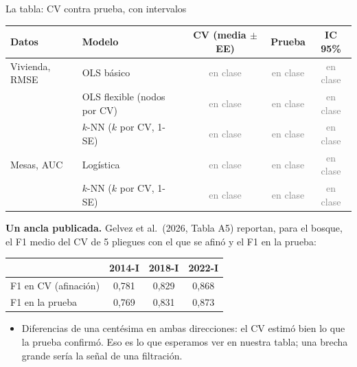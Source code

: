 \documentclass{beamer}
\newcommand{\1}{\mathbb{I}}
\begin{document}
\begin{frame}{La tabla: CV contra prueba, con intervalos}
\small
\begin{center}
\scriptsize
\setlength{\tabcolsep}{3pt}
\renewcommand{\arraystretch}{1.2}
\begin{tabular}{llccc}
\hline
Datos & Modelo & CV (media $\pm$ EE) & Prueba & IC 95\% \\
\hline
Vivienda, RMSE & OLS básico & \textcolor{gray}{en clase} & \textcolor{gray}{en clase} & \textcolor{gray}{en clase} \\
 & OLS flexible (nodos por CV) & \textcolor{gray}{en clase} & \textcolor{gray}{en clase} & \textcolor{gray}{en clase} \\
 & $k$-NN ($k$ por CV, 1-SE) & \textcolor{gray}{en clase} & \textcolor{gray}{en clase} & \textcolor{gray}{en clase} \\
Mesas, AUC & Logística & \textcolor{gray}{en clase} & \textcolor{gray}{en clase} & \textcolor{gray}{en clase} \\
 & $k$-NN ($k$ por CV, 1-SE) & \textcolor{gray}{en clase} & \textcolor{gray}{en clase} & \textcolor{gray}{en clase} \\
\hline
\end{tabular}
\end{center}
\pause
\vspace{0.1cm}
\textbf{Un ancla publicada.} Gelvez et al.\ (2026, Tabla A5) reportan, para el bosque, el F1 medio del CV de 5 pliegues con el que se afinó y el F1 en la prueba:
\begin{center}
\footnotesize
\begin{tabular}{lccc}
\hline
 & 2014-I & 2018-I & 2022-I \\
\hline
F1 en CV (afinación) & 0,781 & 0,829 & 0,868 \\
F1 en la prueba & 0,769 & 0,831 & 0,873 \\
\hline
\end{tabular}
\end{center}
\pause
\begin{itemize}\itemsep2pt
  \item Diferencias de una centésima en ambas direcciones: el CV estimó bien lo que la prueba confirmó. Eso es lo que esperamos ver en nuestra tabla; una brecha grande sería la señal de una filtración.
\end{itemize}
\end{frame}
\end{document}
